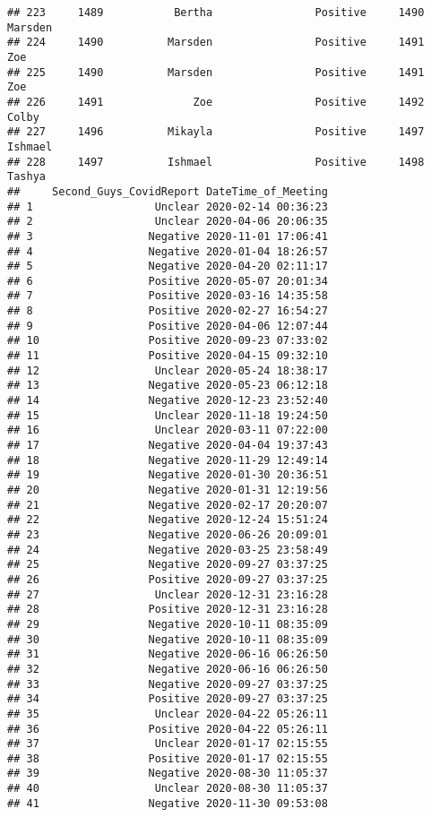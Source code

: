 \documentclass[
]{article}
\begin{document}
\begin{verbatim}
## 223     1489           Bertha                Positive     1490          Marsden
## 224     1490          Marsden                Positive     1491              Zoe
## 225     1490          Marsden                Positive     1491              Zoe
## 226     1491              Zoe                Positive     1492            Colby
## 227     1496          Mikayla                Positive     1497          Ishmael
## 228     1497          Ishmael                Positive     1498           Tashya
##     Second_Guys_CovidReport DateTime_of_Meeting
## 1                   Unclear 2020-02-14 00:36:23
## 2                   Unclear 2020-04-06 20:06:35
## 3                  Negative 2020-11-01 17:06:41
## 4                  Negative 2020-01-04 18:26:57
## 5                  Negative 2020-04-20 02:11:17
## 6                  Positive 2020-05-07 20:01:34
## 7                  Positive 2020-03-16 14:35:58
## 8                  Positive 2020-02-27 16:54:27
## 9                  Positive 2020-04-06 12:07:44
## 10                 Positive 2020-09-23 07:33:02
## 11                 Positive 2020-04-15 09:32:10
## 12                  Unclear 2020-05-24 18:38:17
## 13                 Negative 2020-05-23 06:12:18
## 14                 Negative 2020-12-23 23:52:40
## 15                  Unclear 2020-11-18 19:24:50
## 16                  Unclear 2020-03-11 07:22:00
## 17                 Negative 2020-04-04 19:37:43
## 18                 Negative 2020-11-29 12:49:14
## 19                 Negative 2020-01-30 20:36:51
## 20                 Negative 2020-01-31 12:19:56
## 21                 Negative 2020-02-17 20:20:07
## 22                 Negative 2020-12-24 15:51:24
## 23                 Negative 2020-06-26 20:09:01
## 24                 Negative 2020-03-25 23:58:49
## 25                 Negative 2020-09-27 03:37:25
## 26                 Positive 2020-09-27 03:37:25
## 27                  Unclear 2020-12-31 23:16:28
## 28                 Positive 2020-12-31 23:16:28
## 29                 Negative 2020-10-11 08:35:09
## 30                 Negative 2020-10-11 08:35:09
## 31                 Negative 2020-06-16 06:26:50
## 32                 Negative 2020-06-16 06:26:50
## 33                 Negative 2020-09-27 03:37:25
## 34                 Positive 2020-09-27 03:37:25
## 35                  Unclear 2020-04-22 05:26:11
## 36                 Positive 2020-04-22 05:26:11
## 37                  Unclear 2020-01-17 02:15:55
## 38                 Positive 2020-01-17 02:15:55
## 39                 Negative 2020-08-30 11:05:37
## 40                  Unclear 2020-08-30 11:05:37
## 41                 Negative 2020-11-30 09:53:08

\end{verbatim}
\end{document}
